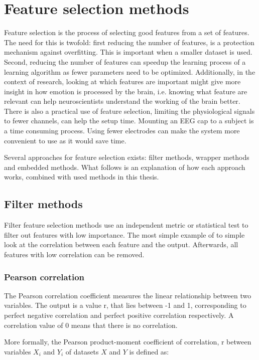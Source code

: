 \section{Feature selection methods}
\label{FSSel}
Feature selection is the process of selecting good features from a set of features. The need for this is twofold: first reducing the number of features, is a protection mechanism against overfitting\citep{rfPaper}. This is important when a smaller dataset is used. Second, reducing the number of features can speedup the learning process of a learning algorithm as fewer parameters need to be optimized. Additionally, in the context of research, looking at which features are important might give more insight in how emotion is processed by the brain, i.e. knowing what feature are relevant can help neuroscientists understand the working of the brain better. There is also a practical use of feature selection, limiting the physiological signals to fewer channels, can help the setup time. Mounting an EEG cap to a subject is a time consuming process. Using fewer electrodes can make the system more convenient to use as it would save time.

\npar

Several approaches for feature selection exists: filter methods, wrapper methods and embedded methods. What follows is an explanation of how each approach works, combined with used methods in this thesis.

\subsection{Filter methods}
Filter feature selection methods use an independent metric or statistical test to filter out features with low importance. The most simple example of to simple look at the correlation between each feature and the output. Afterwards, all features with low correlation can be removed.

\subsubsection{Pearson correlation}
The Pearson correlation coefficient measures the linear relationship between two variables. The output is a value r, that lies between -1 and 1, corresponding to perfect negative correlation and perfect positive correlation respectively. A correlation value of 0 means that there is no correlation.

\npar

More formally\citep{corrPaper}, the Pearson product-moment coefficient of correlation, r between variables $X_i$ and $Y_i$ of datasets $X$ and $Y$ is defined as:

